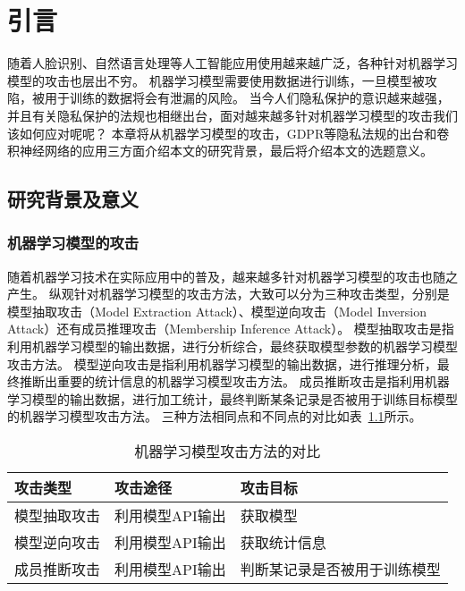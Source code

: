 
\chapter{引言}

随着人脸识别、自然语言处理等人工智能应用使用越来越广泛，各种针对机器学习模型的攻击也层出不穷。
机器学习模型需要使用数据进行训练，一旦模型被攻陷，被用于训练的数据将会有泄漏的风险。
当今人们隐私保护的意识越来越强，并且有关隐私保护的法规也相继出台，面对越来越多针对机器学习模型的攻击我们该如何应对呢呢？
本章将从机器学习模型的攻击，GDPR等隐私法规的出台和卷积神经网络的应用三方面介绍本文的研究背景，最后将介绍本文的选题意义。

\section{研究背景及意义}

\subsection{机器学习模型的攻击}
随着机器学习技术在实际应用中的普及，越来越多针对机器学习模型的攻击也随之产生。
纵观针对机器学习模型的攻击方法，大致可以分为三种攻击类型，分别是模型抽取攻击（Model Extraction Attack）、模型逆向攻击（Model Inversion Attack）还有成员推理攻击（Membership Inference Attack）。
模型抽取攻击是指利用机器学习模型的输出数据，进行分析综合，最终获取模型参数的机器学习模型攻击方法。
模型逆向攻击是指利用机器学习模型的输出数据，进行推理分析，最终推断出重要的统计信息的机器学习模型攻击方法。
成员推断攻击是指利用机器学习模型的输出数据，进行加工统计，最终判断某条记录是否被用于训练目标模型的机器学习模型攻击方法。
三种方法相同点和不同点的对比如表~\ref{tab:model-attack-difference}所示。
\begin{table}
    \centering
    \caption{机器学习模型攻击方法的对比}
    \begin{tabular}{lll}
      \toprule
      攻击类型  & 攻击途径 & 攻击目标  \\
      \midrule
      模型抽取攻击   & 利用模型API输出 & 获取模型 \\
      模型逆向攻击   & 利用模型API输出 & 获取统计信息                    \\
      成员推断攻击 & 利用模型API输出  & 判断某记录是否被用于训练模型  \\
      \bottomrule
    \end{tabular}
    \label{tab:model-attack-difference}
\end{table}

